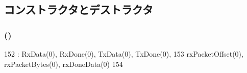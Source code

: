 \subsection{コンストラクタとデストラクタ}
\hypertarget{structSinic_1_1Device_1_1VirtualReg_a23a91ef4f737638e489fa9a82174e918}{
\subsubsection[{VirtualReg}]{ ()}}
\label{structSinic_1_1Device_1_1VirtualReg_a23a91ef4f737638e489fa9a82174e918}



\begin{DoxyCode}
152             : RxData(0), RxDone(0), TxData(0), TxDone(0),
153               rxPacketOffset(0), rxPacketBytes(0), rxDoneData(0)
154         { }
\end{DoxyCode}


